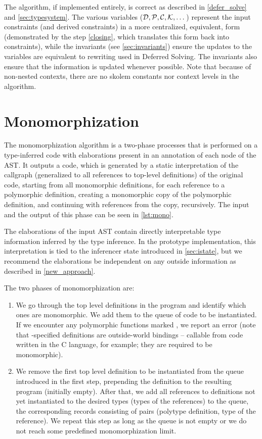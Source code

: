 The algorithm, if implemented entirely, is correct as described in \cref{defer_solve} and \cref{sec:typesystem}. The various variables ($\mathcal D, \mathcal P, \mathcal C, \mathcal K, \dots$) represent the input constraints (and derived constraints) in a more centralized, equivalent, form (demonstrated by the step \ref{closing}, which translates this form back into constraints), while the invariants (see \cref{sec:invariants}) ensure the updates to the variables are equivalent to rewriting used in Deferred Solving. The invariants also ensure that the information is updated whenever possible. Note that because of non-nested contexts, there are no skolem constants nor context levels in the algorithm.

\section{Monomorphization}
\label{sec:mono}

The monomorphization algorithm is a two-phase processes that is performed on a type-inferred code with elaborations present in an annotation of each node of the AST. It outputs a code, which is generated by a static interpretation of the callgraph (generalized to all references to top-level definitions) of the original code, starting from all monomorphic definitions, for each reference to a polymorphic definition, creating a monomorphic copy of the polymorphic definition, and continuing with references from the copy, recursively. The input and the output of this phase can be seen in \cref{lst:mono}.

The elaborations of the input AST contain directly interpretable type information inferred by the type inference. In the prototype implementation, this interpretation is tied to the inferencer state introduced in \cref{sec:istate}, but we recommend the elaborations be independent on any outside information as described in \cref{new_approach}.

The two phases of monomorphization are:

\begin{enumerate}
    \item We go through the top level definitions in the program and identify which ones are monomorphic. We add them to the queue of code to be instantiated. If we encounter any polymorphic functions marked , we report an error (note that -specified definitions are outside-world bindings -- callable from code written in the C language, for example; they are required to be monomorphic).

    \item We remove the first top level definition to be instantiated from the queue introduced in the first step, prepending the definition to the resulting program (initially empty). After that, we add all references to  definitions not yet instantiated to the desired types (types of the references) to the queue, the corresponding records consisting of pairs (polytype definition, type of the reference). We repeat this step as long as the queue is not empty or we do not reach some predefined monomorphization limit. \label{steptwo}
\end{enumerate}

